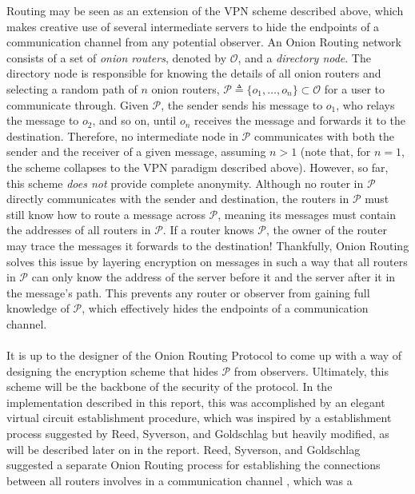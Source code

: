 \documentclass[10pt]{report}
\begin{document}
Routing may be seen as an extension of the VPN scheme described above, which makes creative use of
several intermediate servers to hide the endpoints of a communication channel from any potential
observer. An Onion Routing network consists of a set of \textit{onion routers}, denoted by
$\mathcal{O}$, and a \textit{directory node}. The directory node is responsible for knowing the
details of all onion routers and selecting a random path of $n$ onion routers,
$\mathcal{P}\triangleq\{o_1,\dots
,o_n\}\subset\mathcal{O}$ for a user to communicate through. Given $\mathcal{P}$, the sender sends
his message to $o_1$, who relays the message to $o_2$, and so on, until $o_n$ receives the message
and forwards it to the destination. Therefore, no intermediate node in $\mathcal{P}$ communicates
with both the sender and the receiver of a given message, assuming $n > 1$ (note that, for $n=1$,
the scheme collapses to the VPN paradigm described above). However, so far, this scheme \textit{does
not} provide complete anonymity. Although no router in $\mathcal{P}$ directly communicates with the
sender and destination, the routers in $\mathcal{P}$ must still know how to route a message across
$\mathcal{P}$, meaning its messages must contain the addresses of all routers in $\mathcal{P}$. If a
router knows $\mathcal{P}$, the owner of the router may trace the messages it
forwards to the destination! Thankfully, Onion Routing solves this issue by layering encryption on
messages in such a way that all routers in $\mathcal{P}$ can only know the address of the server
before it and the server after it in the message's path. This prevents any router or observer from
gaining full knowledge of $\mathcal{P}$, which effectively hides the endpoints of a communication
channel.\\\\
It is up to the designer of the Onion Routing Protocol to come up with a way of designing the
encryption scheme that hides $\mathcal{P}$ from observers. Ultimately, this scheme will be the
backbone of the security of the protocol. In the implementation described in this report, this was
accomplished by an elegant virtual circuit establishment procedure, which was inspired by a
establishment process suggested by Reed, Syverson, and Goldschlag \cite{OnionRoutingPatent} but
heavily modified, as will be described later on in the report. Reed, Syverson, and Goldschlag
suggested a separate Onion Routing process for establishing the connections between all routers
involves in a communication channel \cite{OnionRoutingPatent,HidingRoutingInformation}, which was a
\end{document}
